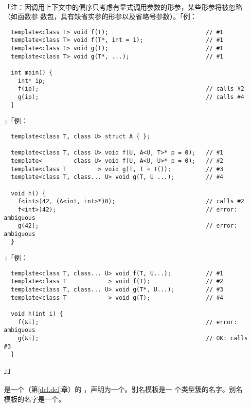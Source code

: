 \paragraph{}
「注：因调用上下文中的偏序只考虑有显式调用参数的形参，某些形参将被忽略（如函数参
数包，具有缺省实参的形参以及省略号参数）。「例：
\begin{lstlisting}
  template<class T> void f(T);                            // #1
  template<class T> void f(T*, int = 1);                  // #1
  template<class T> void g(T);                            // #1
  template<class T> void g(T*, ...);                      // #1

  int main() {
    int* ip;
    f(ip);                                                // calls #2
    g(ip);                                                // calls #4
  }
\end{lstlisting}」「例：
\begin{lstlisting}
  template<class T, class U> struct A { };

  template<class T, class U> void f(U, A<U, T>* p = 0);   // #1
  template<         class U> void f(U, A<U, U>* p = 0);   // #2
  template<class T         > void g(T, T = T());          // #3
  template<class T, class... U> void g(T, U ...);         // #4

  void h() {
    f<int>(42, (A<int, int>*)0);                          // calls #2
    f<int>(42);                                           // error: ambiguous
    g(42);                                                // error: ambiguous
  }
\end{lstlisting}」「例：
\begin{lstlisting}
  template<class T, class... U> void f(T, U...);          // #1
  template<class T            > void f(T);                // #2
  template<class T, class... U> void g(T*, U...);         // #3
  template<class T            > void g(T);                // #4

  void h(int i) {
    f(&i);                                                // error: ambiguous
    g(&i);                                                // OK: calls #3
  }
\end{lstlisting}」」

\paragraph{}
是一个（第\ref{dcl.dcl}章）的
，声明为一个。别名模板是一
个类型簇的名字。别名模板的名字是一个。

